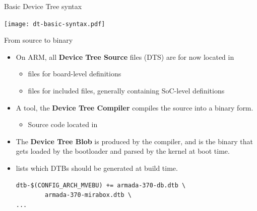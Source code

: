 \documentclass[obeyspaces,spaces,hyphens]{beamer}
\begin{document}
\begin{frame}{Basic Device Tree syntax}
  \begin{center}
    \texttt{[image: dt-basic-syntax.pdf]}
  \end{center}
\end{frame}

\begin{frame}[fragile]{From source to binary}
  \begin{itemize}
  \item On ARM, all {\bf Device Tree Source} files (DTS) are for now
    located in 
    \begin{itemize}
    \item {} files for board-level definitions
    \item {} files for included files, generally containing
      SoC-level definitions
    \end{itemize}
  \item A tool, the {\bf Device Tree Compiler} compiles the source
    into a binary form.
    \begin{itemize}
    \item Source code located in 
    \end{itemize}
  \item The {\bf Device Tree Blob} is produced by the compiler, and is
    the binary that gets loaded by the bootloader and parsed by the
    kernel at boot time.
  \item {} lists which DTBs
    should be generated at build time.
    \begin{block}{}
      \tiny
\begin{verbatim}
dtb-$(CONFIG_ARCH_MVEBU) += armada-370-db.dtb \
        armada-370-mirabox.dtb \
...
\end{verbatim}
    \end{block}
  \end{itemize}
\end{frame}
\end{document}
